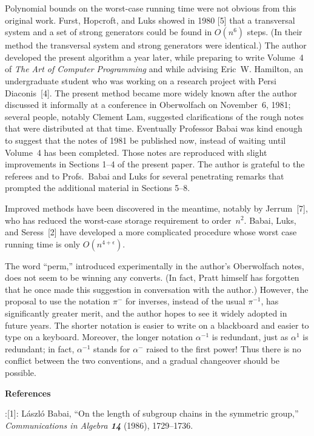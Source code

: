 Polynomial bounds on the worst-case running time were not obvious
from this original work.
Furst, Hopcroft, and Luks showed in 1980 [5] that a transversal system
and a set of strong generators could be found in $O(n^6)$ steps. (In
their method the transversal system and strong generators were
identical.) The author developed the present algorithm a year later,
while preparing to write Volume~4 of
{\sl The Art of Computer Programming} and while advising 
Eric~W. Hamilton, an undergraduate
student who was working on a research project with Persi Diaconis~[4].
 The present method became more widely known after
the author discussed it informally at a conference in Oberwolfach on
November~6, 1981; several people, notably Clement Lam, suggested
clarifications of the rough notes that were distributed at that time.
Eventually Professor Babai was kind enough to suggest that the notes of
1981 be published now, instead of waiting until Volume~4 has been completed.
Those notes are reproduced with slight improvements in Sections 1--4 of the
present paper. The author is grateful to the referees and to Profs.\ Babai and Luks
for several penetrating remarks that prompted the additional material in
Sections 5--8.

Improved methods have been discovered in the meantime, notably by Jerrum~[7],
who has reduced the worst-case storage requirement to order~$n^2$. 
Babai, Luks, and Seress~[2]
have developed a more complicated procedure whose worst case running time is
only $O(n^{4+\epsilon})$.

The word ``perm,'' introduced experimentally in the author's Oberwolfach notes,
does not seem to be winning any converts. (In fact, Pratt himself has forgotten
that he once made this suggestion in conversation with the author.) However,
the proposal to use the notation $\pi^-$ for inverses, instead of the
usual $\pi^{-1}$, has significantly greater merit, and the author hopes to
see it widely adopted in future years.
The shorter notation is easier to write on a blackboard and easier to type
on a keyboard. Moreover, the longer
notation $\alpha^{-1}$ is redundant, just as $\alpha^1$ is
redundant; in fact, $\alpha^{-1}$ stands for $\alpha^-$ raised to the first
power! Thus there is no conflict between the two conventions, and a
gradual changeover should be possible.

\bigskip
\centerline{\bf References}

\medskip
\disleft 20pt:[1]:
L\'aszl\'o Babai,
``On the length of subgroup chains in the symmetric group,''
{\sl Communications in Algebra\/ \bf 14}
(1986), 1729--1736.

